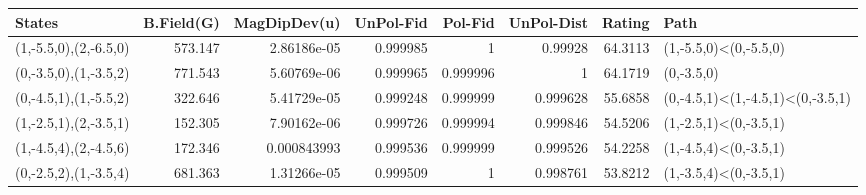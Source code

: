 \begin{tabular}{lrrrrrrl}
\hline
 States                &   B.Field(G) &   MagDipDev(u) &   UnPol-Fid &   Pol-Fid &   UnPol-Dist &   Rating & Path                             \\
\hline
 (1,-5.5,0),(2,-6.5,0) &      573.147 &    2.86186e-05 &    0.999985 &  1        &     0.99928  &  64.3113 & (1,-5.5,0)<(0,-5.5,0)            \\
 (0,-3.5,0),(1,-3.5,2) &      771.543 &    5.60769e-06 &    0.999965 &  0.999996 &     1        &  64.1719 & (0,-3.5,0)                       \\
 (0,-4.5,1),(1,-5.5,2) &      322.646 &    5.41729e-05 &    0.999248 &  0.999999 &     0.999628 &  55.6858 & (0,-4.5,1)<(1,-4.5,1)<(0,-3.5,1) \\
 (1,-2.5,1),(2,-3.5,1) &      152.305 &    7.90162e-06 &    0.999726 &  0.999994 &     0.999846 &  54.5206 & (1,-2.5,1)<(0,-3.5,1)            \\
 (1,-4.5,4),(2,-4.5,6) &      172.346 &    0.000843993 &    0.999536 &  0.999999 &     0.999526 &  54.2258 & (1,-4.5,4)<(0,-3.5,1)            \\
 (0,-2.5,2),(1,-3.5,4) &      681.363 &    1.31266e-05 &    0.999509 &  1        &     0.998761 &  53.8212 & (1,-3.5,4)<(0,-3.5,1)            \\
\hline
\end{tabular}